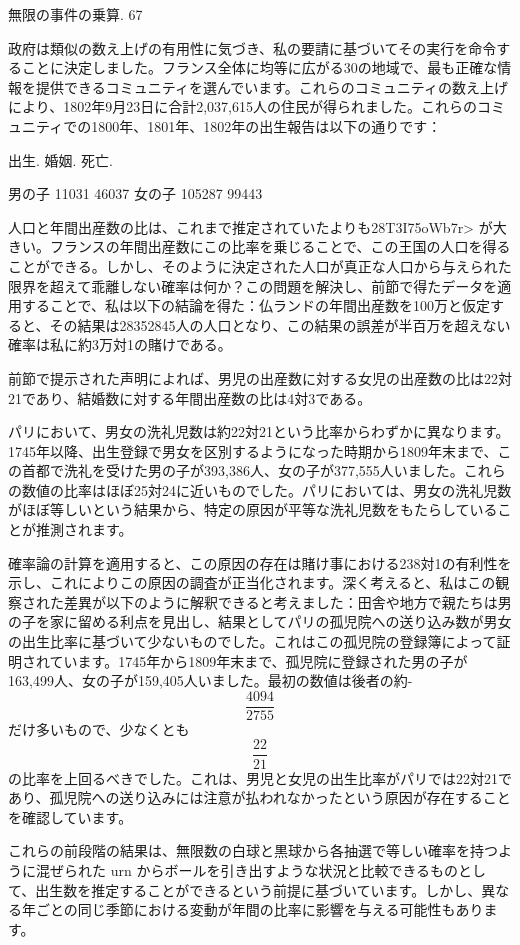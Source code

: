 \documentclass[a4paper,11pt,openany]{ltjsbook}
\begin{document}
無限の事件の乗算. 67

政府は類似の数え上げの有用性に気づき、私の要請に基づいてその実行を命令することに決定しました。フランス全体に均等に広がる30の地域で、最も正確な情報を提供できるコミュニティを選んでいます。これらのコミュニティの数え上げにより、1802年9月23日に合計2,037,615人の住民が得られました。これらのコミュニティでの1800年、1801年、1802年の出生報告は以下の通りです：

出生. 婚姻. 死亡.

男の子 11031 46037
女の子 105287 99443

人口と年間出産数の比は、これまで推定されていたよりも28T3I75oWb7r> が大きい。フランスの年間出産数にこの比率を乗じることで、この王国の人口を得ることができる。しかし、そのように決定された人口が真正な人口から与えられた限界を超えて乖離しない確率は何か？この問題を解決し、前節で得たデータを適用することで、私は以下の結論を得た：仏ランドの年間出産数を100万と仮定すると、その結果は28352845人の人口となり、この結果の誤差が半百万を超えない確率は私に約3万対1の賭けである。

前節で提示された声明によれば、男児の出産数に対する女児の出産数の比は22対21であり、結婚数に対する年間出産数の比は4対3である。

パリにおいて、男女の洗礼児数は約22対21という比率からわずかに異なります。1745年以降、出生登録で男女を区別するようになった時期から1809年末まで、この首都で洗礼を受けた男の子が393,386人、女の子が377,555人いました。これらの数値の比率はほぼ25対24に近いものでした。パリにおいては、男女の洗礼児数がほぼ等しいという結果から、特定の原因が平等な洗礼児数をもたらしていることが推測されます。

確率論の計算を適用すると、この原因の存在は賭け事における238対1の有利性を示し、これによりこの原因の調査が正当化されます。深く考えると、私はこの観察された差異が以下のように解釈できると考えました：田舎や地方で親たちは男の子を家に留める利点を見出し、結果としてパリの孤児院への送り込み数が男女の出生比率に基づいて少ないものでした。これはこの孤児院の登録簿によって証明されています。1745年から1809年末まで、孤児院に登録された男の子が163,499人、女の子が159,405人いました。最初の数値は後者の約-$$\frac{4094}{2755}$$だけ多いもので、少なくとも$$\frac{22}{21}$$の比率を上回るべきでした。これは、男児と女児の出生比率がパリでは22対21であり、孤児院への送り込みには注意が払われなかったという原因が存在することを確認しています。

これらの前段階の結果は、無限数の白球と黒球から各抽選で等しい確率を持つように混ぜられた urn からボールを引き出すような状況と比較できるものとして、出生数を推定することができるという前提に基づいています。しかし、異なる年ごとの同じ季節における変動が年間の比率に影響を与える可能性もあります。
\end{document}
